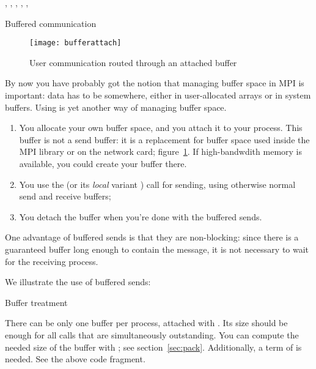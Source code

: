 \begin{mpifour}

,
,
,
,
,

\end{mpifour}

 {Buffered communication}
\label{sec:buffered}

\begin{figure}[ht]
  \texttt{[image: bufferattach]}
  \caption{User communication routed through an attached buffer}
  \label{fig:bufattach}
\end{figure}

By now you have probably got the notion that managing buffer
space in MPI is important: data has to be somewhere, either in
user-allocated arrays or in system buffers. Using
 is yet another
way of managing buffer space.
\begin{enumerate}
\item You allocate your own buffer space, and you attach it to your
  process. This buffer is not a send buffer: it is a replacement for
  buffer space used inside the MPI library or on the network card;
  figure~\ref{fig:bufattach}. If high-bandwdith memory is available,
  you could create your buffer there.
\item You use the 
  (or its \emph{local} variant )
  call for sending, using
  otherwise normal send and receive buffers;
\item You detach the buffer when you're done with the buffered sends.
\end{enumerate}

One advantage of buffered sends is that they are non-blocking:
since there is a guaranteed buffer long enough to contain the
message, it is not necessary to wait for the receiving process.

We illustrate the use of buffered sends:


 {Buffer treatment}

There can be only one buffer per process, attached with
.
Its size should be enough
for all  calls that are simultaneously
outstanding.
You can compute the needed size of the buffer with ;
see section~\ref{sec:pack}.
Additionally, a term of  is needed.
See the above code fragment.

